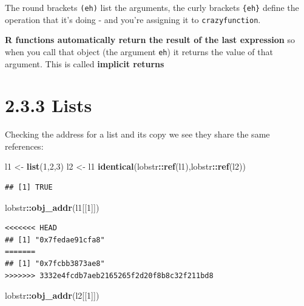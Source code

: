 \documentclass[]{book}
\newenvironment{Shaded}{\begin{snugshade}}{\end{snugshade}}
\newcommand{\DecValTok}[1]{\textcolor[rgb]{0.00,0.00,0.81}{#1}}
\newcommand{\KeywordTok}[1]{\textcolor[rgb]{0.13,0.29,0.53}{\textbf{#1}}}
\newcommand{\NormalTok}[1]{#1}
\newcommand{\OperatorTok}[1]{\textcolor[rgb]{0.81,0.36,0.00}{\textbf{#1}}}
\newcommand{\StringTok}[1]{\textcolor[rgb]{0.31,0.60,0.02}{#1}}
\begin{document}
The round brackets \texttt{(eh)} list the arguments, the curly brackets \texttt{\{eh\}} define the operation that it's doing - and you're assigning it to \texttt{crazyfunction}.

\textbf{R functions automatically return the result of the last expression} so when you call that object (the argument \texttt{eh}) it returns the value of that argument. This is called \textbf{implicit returns}

\hypertarget{lists}{%
\section*{2.3.3 Lists}\label{lists}}

Checking the address for a list and its copy we see they share the same references:

\begin{Shaded}
\begin{Highlighting}[]
\NormalTok{l1 <-}\StringTok{ }\KeywordTok{list}\NormalTok{(}\DecValTok{1}\NormalTok{,}\DecValTok{2}\NormalTok{,}\DecValTok{3}\NormalTok{)}
\NormalTok{l2 <-}\StringTok{ }\NormalTok{l1}
\KeywordTok{identical}\NormalTok{(lobstr}\OperatorTok{::}\KeywordTok{ref}\NormalTok{(l1),lobstr}\OperatorTok{::}\KeywordTok{ref}\NormalTok{(l2))}
\end{Highlighting}
\end{Shaded}

\begin{verbatim}
## [1] TRUE
\end{verbatim}

\begin{Shaded}
\begin{Highlighting}[]
\NormalTok{lobstr}\OperatorTok{::}\KeywordTok{obj_addr}\NormalTok{(l1[[}\DecValTok{1}\NormalTok{]])}
\end{Highlighting}
\end{Shaded}

\begin{verbatim}
<<<<<<< HEAD
## [1] "0x7fedae91cfa8"
=======
## [1] "0x7fcbb3873ae8"
>>>>>>> 3332e4fcdb7aeb2165265f2d20f8b8c32f211bd8
\end{verbatim}

\begin{Shaded}
\begin{Highlighting}[]
\NormalTok{lobstr}\OperatorTok{::}\KeywordTok{obj_addr}\NormalTok{(l2[[}\DecValTok{1}\NormalTok{]])}
\end{Highlighting}
\end{Shaded}
\end{document}
